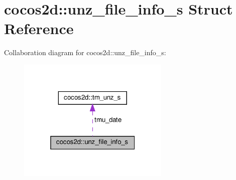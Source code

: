 \hypertarget{structcocos2d_1_1unz__file__info__s}{}\section{cocos2d\+:\+:unz\+\_\+file\+\_\+info\+\_\+s Struct Reference}
\label{structcocos2d_1_1unz__file__info__s}


Collaboration diagram for cocos2d\+:\+:unz\+\_\+file\+\_\+info\+\_\+s\+:
\nopagebreak
\begin{figure}[H]
\begin{center}
\leavevmode
\includegraphics[width=205pt]{structcocos2d_1_1unz__file__info__s__coll__graph}
\end{center}
\end{figure}
